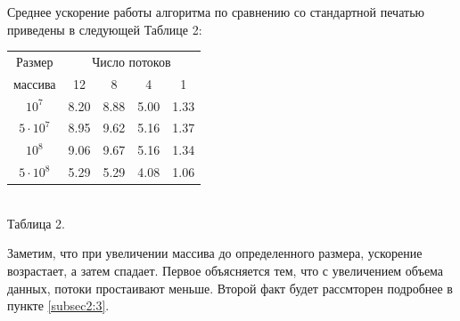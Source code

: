 Среднее ускорение работы алгоритма по сравнению со стандартной печатью приведены в следующей Таблице 2:
\begin{center}
\begin{tabular}{||c|c|c|c|c||}
\hline
\hline
Размер & \multicolumn{4}{c||}{Число потоков}\\
\hhline{~|-|-|-|-|}
массива & 12 & 8 & 4 & 1 \\
\hline
$10^7$ & 8.20 & 8.88 & 5.00 & 1.33 \\
\hline
$5 \cdot 10^7$ & 8.95 & 9.62 & 5.16 & 1.37 \\
\hline
$10^8$ & 9.06 & 9.67 & 5.16 & 1.34\\
\hline
$5 \cdot 10^8$ & 5.29 & 5.29 & 4.08 & 1.06\\
\hline
\hline
\end{tabular}
\\\vspace{10pt}
\small{Таблица 2.}
\end{center}

Заметим, что при увеличении массива до определенного размера, ускорение возрастает, а затем спадает.
Первое объясняется тем, что с увеличением объема данных, потоки простаивают меньше.
Второй факт будет рассмторен подробнее в пункте \ref{subsec2:3}.

